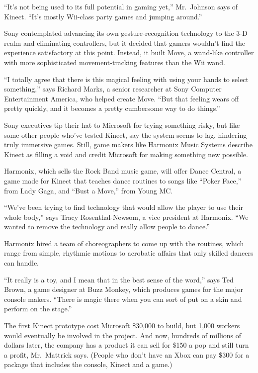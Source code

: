 ﻿\documentclass[12pt]{article}
\begin{document}
``It's not being used to its full potential in gaming yet,'' Mr.~Johnson says of Kinect. ``It's
mostly Wii-class party games and jumping around.''

Sony contemplated advancing its own gesture-recognition technology to the 3-D realm and eliminating
controllers, but it decided that gamers wouldn't find the experience satisfactory at this point.
Instead, it built Move, a wand-like controller with more sophisticated movement-tracking features
than the Wii wand.

``I totally agree that there is this magical feeling with using your hands to select something,''
says Richard Marks, a senior researcher at Sony Computer Entertainment America, who helped create
Move. ``But that feeling wears off pretty quickly, and it becomes a pretty cumbersome way to do
things.''

Sony executives tip their hat to Microsoft for trying something risky, but like some other people
who've tested Kinect, say the system seems to lag, hindering truly immersive games. Still, game
makers like Harmonix Music Systems describe Kinect as filling a void and credit Microsoft for making
something new possible.

Harmonix, which sells the Rock Band music game, will offer Dance Central, a game made for Kinect
that teaches dance routines to songs like ``Poker Face,'' from Lady Gaga, and ``Bust a Move,'' from
Young MC.

``We've been trying to find technology that would allow the player to use their whole body,'' says
Tracy Rosenthal-Newsom, a vice president at Harmonix. ``We wanted to remove the technology and
really allow people to dance.''

Harmonix hired a team of choreographers to come up with the routines, which range from simple,
rhythmic motions to acrobatic affairs that only skilled dancers can handle.

``It really is a toy, and I mean that in the best sense of the word,'' says Ted Brown, a game
designer at Buzz Monkey, which produces games for the major console makers. ``There is magic there
when you can sort of put on a skin and perform on the stage.''

The first Kinect prototype cost Microsoft \$30,000 to build, but 1,000 workers would eventually be
involved in the project. And now, hundreds of millions of dollars later, the company has a product
it can sell for \$150 a pop and still turn a profit, Mr.~Mattrick says. (People who don't have an
Xbox can pay \$300 for a package that includes the console, Kinect and a game.)
\end{document}
